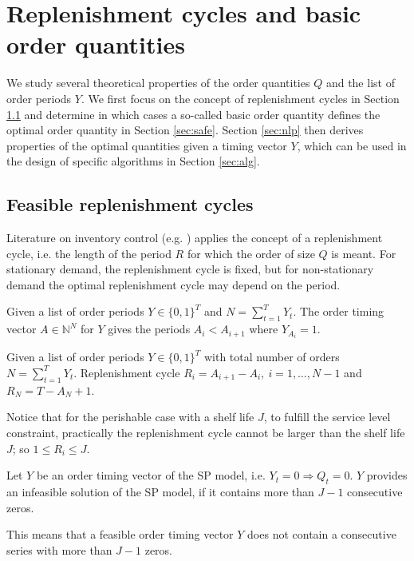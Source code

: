 \section{Replenishment cycles and basic order quantities}
\label{sec:rcot}
%
We study several theoretical properties of the order quantities $Q$ and the list of order periods $Y$. We first focus on the concept of replenishment cycles in Section \ref{sec:repl} and determine in which cases a so-called basic order quantity defines the optimal order quantity in Section \ref{sec:safe}. Section \ref{sec:nlp} then derives properties of the optimal quantities given a timing vector $Y$, which can be used in the design of specific algorithms in Section \ref{sec:alg}.


\subsection{Feasible replenishment cycles}
\label{sec:repl}

Literature on inventory control (e.g. \cite{Silver98}) applies the concept of a replenishment cycle, i.e. the length of the period $R$ for which the order of size $Q$ is meant. For stationary demand, the replenishment cycle is fixed, but for non-stationary demand the optimal replenishment cycle may depend on the period.
 \begin{defn}
 \label{def:A}
Given a list of order periods $Y\in \{0,1\}^T$ and $N=\sum_{t=1}^T Y_t$. The order timing vector $A \in \mathbb{N}^N$ for $Y$ gives the periods $A_i< A_{i+1}$ where  $Y_{A_i}=1$.
\end{defn}
%
\begin{defn}
 \label{def:R}
Given a list of order periods $Y\in \{0,1\}^T$ with total number of orders $N=\sum_{t=1}^T Y_t$. Replenishment cycle $R_i=A_{i+1}-A_i, \ i=1,\ldots,N-1$ and $R_N=T-A_N+1$.
\end{defn}
Notice that for the perishable case with a shelf life $J$, to fulfill the service level constraint, practically the replenishment cycle cannot be larger than the shelf life $J$; so $1 \le R_i \le J$.
\begin{lemma}
\label{lem:Y}
Let $Y$ be an order timing vector of the SP model, i.e. $Y_t=0 \Rightarrow Q_t=0$. $Y$ provides an infeasible solution of the SP model, if it contains more than $J-1$ consecutive zeros.
\end{lemma}
This means that a feasible order timing vector $Y$ does not contain a consecutive series with more than $J-1$ zeros.

